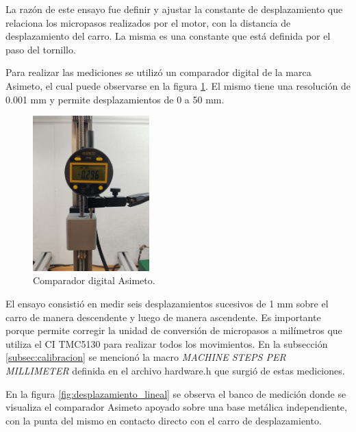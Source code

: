La razón de este ensayo fue definir y ajustar la constante de desplazamiento que relaciona los micropasos realizados por el motor, con la distancia de desplazamiento del carro. La misma es una constante que está definida por el paso del tornillo.

Para realizar las mediciones se utilizó un comparador digital de la marca Asimeto\citep{web_asimeto}, el cual puede observarse en la figura \ref{fig:micrometro}. El mismo tiene una resolución de 0.001 mm y permite desplazamientos de 0 a 50 mm.


\begin{figure}[h!]
\centering 
\includegraphics[width=0.4\textwidth]{./Figures/micrometro.png}
\caption{Comparador digital Asimeto.}
\label{fig:micrometro}
\end{figure}

El ensayo consistió en medir seis desplazamientos sucesivos de 1 mm sobre el carro de manera descendente y luego de manera ascendente. Es importante porque permite corregir la unidad de conversión de micropasos a milímetros que utiliza el CI TMC5130 para realizar todos los movimientos. 
En la subsección \ref{subsec:calibracion} se mencionó la macro \textit{MACHINE STEPS PER MILLIMETER} definida en el archivo hardware.h que surgió de estas mediciones. 

En la figura \ref{fig:desplazamiento_lineal} se observa el banco de medición donde se visualiza el comparador Asimeto apoyado sobre una base metálica independiente, con la punta del mismo en contacto directo con el carro de desplazamiento.

